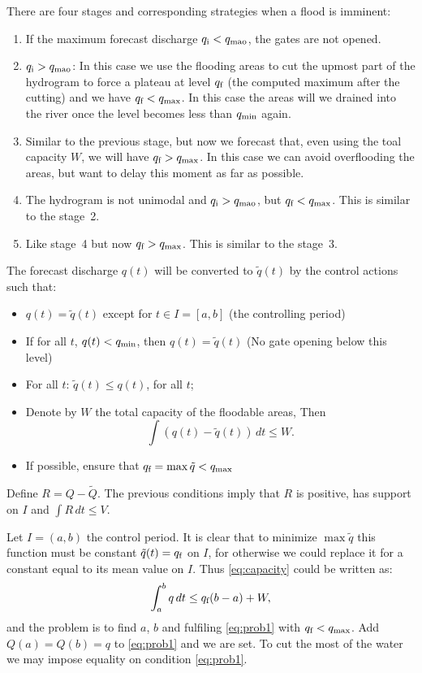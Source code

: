 There are four stages and corresponding strategies when a flood is
imminent:
\begin{enumerate}
\item If the maximum forecast discharge $q_{\mbox{\rm\scriptsize i}}<q_{\mbox{\rm\scriptsize mao}}$, the gates are not
opened. 
\item $q_{\mbox{\rm\scriptsize i}}>q_{\mbox{\rm\scriptsize mao}}$: In this case we use the flooding areas to cut the upmost
part of the hydrogram to force a plateau at level $q_{\mbox{\rm\scriptsize f}}$ (the computed
maximum after the cutting) and we have $q_{\mbox{\rm\scriptsize f}}<q_{\mbox{\rm\scriptsize max}}$. In this case
the areas will we drained into the river once the level becomes less
than $q_{\mbox{\rm\scriptsize min}}$ again.
\item Similar to the previous stage, but now we forecast that, even using
the toal capacity $W$, we will have $q_{\mbox{\rm\scriptsize f}}>q_{\mbox{\rm\scriptsize max}}$. In this case we
can avoid overflooding the areas, but want to delay this moment as
far as possible.
\item The hydrogram is not unimodal and $q_{\mbox{\rm\scriptsize i}}>q_{\mbox{\rm\scriptsize mao}}$, but $q_{\mbox{\rm\scriptsize f}}<q_{\mbox{\rm\scriptsize max}}$.
This is similar to the stage~2.
\item Like stage~4 but now $q_{\mbox{\rm\scriptsize f}}>q_{\mbox{\rm\scriptsize max}}$. This is similar to the stage~3.
\end{enumerate}
The forecast discharge $q(t)$ will be converted to $\tilde{q}(t)$
by the control actions such that:
\begin{itemize}
\item $q(t)=\tilde{q}(t)$ except for $t\in I=[a,b]$ (the controlling period) 
\item If for all $t$, $q(t)<q_{\mbox{\rm\scriptsize min}}$, then $q(t)=\tilde{q}(t)$ (No gate
opening below this level) 
\item For all $t$: $\tilde{q}(t)\leq q(t)$, for all $t$; 
\item Denote by $W$ the total capacity of the floodable areas, Then \begin{equation}
\int(q(t)-\tilde{q}(t))\, dt\leq W.\label{eq:capacity}\end{equation}

\item If possible, ensure that $q_{\mbox{\rm\scriptsize f}}=\max\tilde{q}<q_{\mbox{\rm\scriptsize max}}$ 
\end{itemize}
Define $R=Q-\tilde{Q}$. The previous conditions imply that $R$ is
positive, has support on $I$ and $\int R\, dt\leq V$. 

Let $I=(a,b)$ the control period. It is clear that to minimize $\max\tilde{q}$
this function must be constant $\tilde{q}(t)=q_{\mbox{\rm\scriptsize f}}$ on $I$, for otherwise
we could replace it for a constant equal to its mean value on $I$.
Thus \eqref{eq:capacity} could be written as: \begin{equation}
\int_{a}^{b}q\, dt\leq q_{\mbox{\rm\scriptsize f}}(b-a)+W,\label{eq:prob1}\end{equation}
 and the problem is to find $a$, $b$ and fulfiling \eqref{eq:prob1}
with $q_{\mbox{\rm\scriptsize f}}<q_{\mbox{\rm\scriptsize max}}$. Add $Q(a)=Q(b)=q$ to \eqref{eq:prob1} and we
are set. To cut the most of the water we may impose equality on condition
\eqref{eq:prob1}. 



